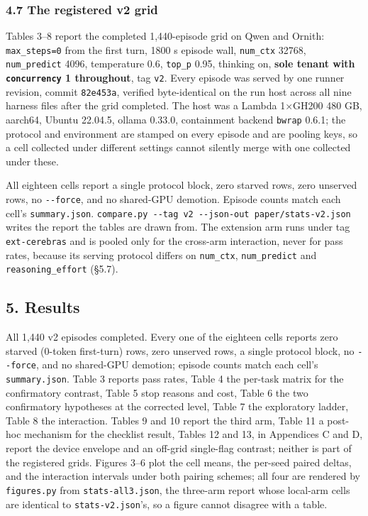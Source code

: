 \documentclass[
  10pt,
  a4paper,
]{article}
\let\oldtexttt\texttt
\renewcommand{\texttt}[1]{{\small\oldtexttt{#1}}}
\begin{document}
\subsubsection{4.7 The registered v2 grid}\label{the-registered-v2-grid}

Tables 3--8 report the completed 1,440-episode grid on Qwen and Ornith:
\texttt{max\_steps=0} from the first turn, 1800 s episode wall,
\texttt{num\_ctx} 32768, \texttt{num\_predict} 4096, temperature 0.6,
\texttt{top\_p} 0.95, thinking on, \textbf{sole tenant with
\texttt{concurrency} 1 throughout}, tag \texttt{v2}. Every episode was
served by one runner revision, commit \texttt{82e453a}, verified
byte-identical on the run host across all nine harness files after the
grid completed. The host was a Lambda 1×GH200 480 GB, aarch64, Ubuntu
22.04.5, ollama 0.33.0, containment backend \texttt{bwrap} 0.6.1; the
protocol and environment are stamped on every episode and are pooling
keys, so a cell collected under different settings cannot silently merge
with one collected under these.

All eighteen cells report a single protocol block, zero starved rows,
zero unserved rows, no \texttt{-\/-force}, and no shared-GPU demotion.
Episode counts match each cell's \texttt{summary.json}.
\texttt{compare.py\ -\/-tag\ v2\ -\/-json-out\ paper/stats-v2.json}
writes the report the tables are drawn from. The extension arm runs
under tag \texttt{ext-cerebras} and is pooled only for the cross-arm
interaction, never for pass rates, because its serving protocol differs
on \texttt{num\_ctx}, \texttt{num\_predict} and
\texttt{reasoning\_effort} (§5.7).

\subsection{5. Results}\label{results}

All 1,440 v2 episodes completed. Every one of the eighteen cells reports
zero starved (0-token first-turn) rows, zero unserved rows, a single
protocol block, no \texttt{-\/-force}, and no shared-GPU demotion;
episode counts match each cell's \texttt{summary.json}. Table 3 reports
pass rates, Table 4 the per-task matrix for the confirmatory contrast,
Table 5 stop reasons and cost, Table 6 the two confirmatory hypotheses
at the corrected level, Table 7 the exploratory ladder, Table 8 the
interaction. Tables 9 and 10 report the third arm, Table 11 a post-hoc
mechanism for the checklist result, Tables 12 and 13, in Appendices C
and D, report the device envelope and an off-grid single-flag contrast;
neither is part of the registered grids. Figures 3--6 plot the cell
means, the per-seed paired deltas, and the interaction intervals under
both pairing schemes; all four are rendered by \texttt{figures.py} from
\texttt{stats-all3.json}, the three-arm report whose local-arm cells are
identical to \texttt{stats-v2.json}'s, so a figure cannot disagree with
a table.
\end{document}
